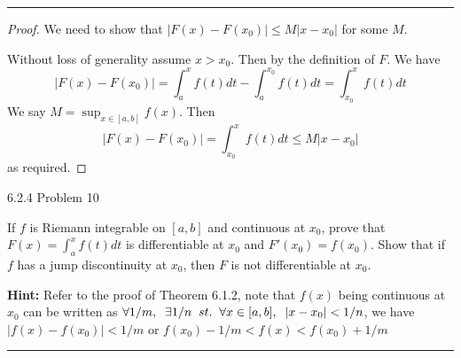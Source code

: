 \documentclass[11pt]{article}
\begin{document}
\hrule


\begin{proof}
    We need to show that $|F(x) - F(x_0)| \leq M |x - x_0|$ for some $M$.

    Without loss of generality assume $x > x_0$. Then by the definition of $F$. 
    We have $$|F(x) - F(x_0)| = \int_a ^x f(t) dt - \int_a ^{x_0} f(t) dt = \int_{x_0} ^x f(t) dt$$ 
    We say $M = \sup_{x \in [a,b]} f(x)$. 
    Then $$|F(x) - F(x_0)| = \int_{x_0} ^x f(t) dt \leq M |x - x_0|$$ as required.
\end{proof}

 6.2.4 Problem 10

If $f$ is Riemann integrable on $[a, b]$ and continuous at $x_0$, prove
that $F(x) = \int_a ^x f(t) dt$ is differentiable at $x_0$ and $F'(x_0) = f(x_0)$.
Show that if $f$ has a jump discontinuity at $x_0$, then $F$ is not
differentiable at $x_0$. 

\textbf{Hint: } Refer to the proof of Theorem 6.1.2, note that $f(x)$ being continuous at $x_0$
can be written as $\forall 1/m, \sp \exists 1/n \sp st. \sp \forall x \in [a,b], \sp |x - x_0| < 1/n$, we have $|f(x) - f(x_0)| < 1/m$
or $f(x_0) - 1/m < f(x) < f(x_0) + 1/m$
\hrule
\end{document}

